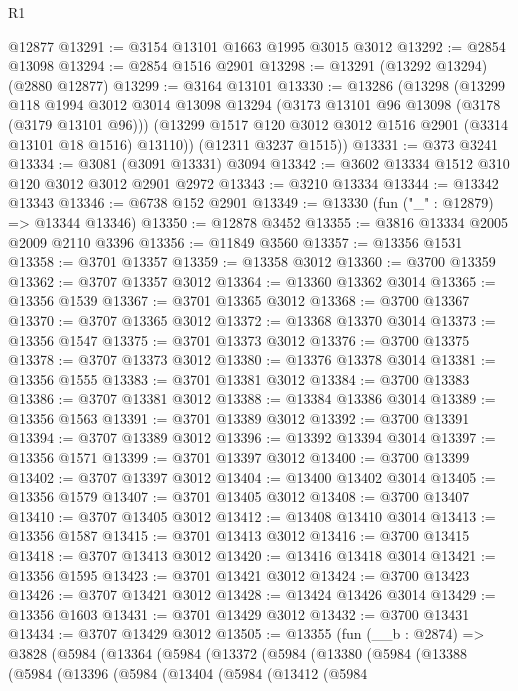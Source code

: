 \begin{lexlean}{R1}
\begin{coremodule}
    @12877
@13291 := @3154 @13101 @1663 @1995 @3015 @3012
@13292 := @2854 @13098
@13294 := @2854 @1516 @2901
@13298 := @13291 (@13292 @13294) (@2880 @12877)
@13299 := @3164 @13101
@13330 := @13286
    (@13298
      (@13299
        @118
        @1994
        @3012
        @3014
        @13098
        @13294
        (@3173 @13101 @96 @13098 (@3178 (@3179 @13101 @96)))
        (@13299 @1517 @120 @3012 @3012 @1516 @2901 (@3314 @13101 @18 @1516) @13110))
      (@12311 @3237 @1515))
@13331 := @373 @3241
@13334 := @3081 (@3091 @13331) @3094
@13342 := @3602 @13334 @1512 @310 @120 @3012 @3012 @2901 @2972
@13343 := @3210 @13334
@13344 := @13342 @13343
@13346 := @6738 @152 @2901
@13349 := @13330 (fun ("_" : @12879) => @13344 @13346)
@13350 := @12878 @3452
@13355 := @3816 @13334 @2005 @2009 @2110 @3396
@13356 := @11849 @3560
@13357 := @13356 @1531
@13358 := @3701 @13357
@13359 := @13358 @3012
@13360 := @3700 @13359
@13362 := @3707 @13357 @3012
@13364 := @13360 @13362 @3014
@13365 := @13356 @1539
@13367 := @3701 @13365 @3012
@13368 := @3700 @13367
@13370 := @3707 @13365 @3012
@13372 := @13368 @13370 @3014
@13373 := @13356 @1547
@13375 := @3701 @13373 @3012
@13376 := @3700 @13375
@13378 := @3707 @13373 @3012
@13380 := @13376 @13378 @3014
@13381 := @13356 @1555
@13383 := @3701 @13381 @3012
@13384 := @3700 @13383
@13386 := @3707 @13381 @3012
@13388 := @13384 @13386 @3014
@13389 := @13356 @1563
@13391 := @3701 @13389 @3012
@13392 := @3700 @13391
@13394 := @3707 @13389 @3012
@13396 := @13392 @13394 @3014
@13397 := @13356 @1571
@13399 := @3701 @13397 @3012
@13400 := @3700 @13399
@13402 := @3707 @13397 @3012
@13404 := @13400 @13402 @3014
@13405 := @13356 @1579
@13407 := @3701 @13405 @3012
@13408 := @3700 @13407
@13410 := @3707 @13405 @3012
@13412 := @13408 @13410 @3014
@13413 := @13356 @1587
@13415 := @3701 @13413 @3012
@13416 := @3700 @13415
@13418 := @3707 @13413 @3012
@13420 := @13416 @13418 @3014
@13421 := @13356 @1595
@13423 := @3701 @13421 @3012
@13424 := @3700 @13423
@13426 := @3707 @13421 @3012
@13428 := @13424 @13426 @3014
@13429 := @13356 @1603
@13431 := @3701 @13429 @3012
@13432 := @3700 @13431
@13434 := @3707 @13429 @3012
@13505 := @13355
    (fun (__b : @2874) =>
    @3828
      (@5984
        (@13364
          (@5984
            (@13372
              (@5984
                (@13380
                  (@5984
                    (@13388
                      (@5984
                        (@13396
                          (@5984
                            (@13404
                              (@5984
                                (@13412
                                  (@5984

\end{coremodule}
\end{lexlean}
